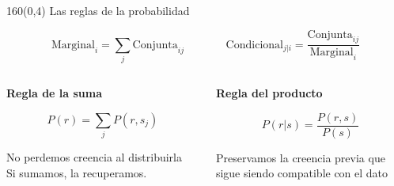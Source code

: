 \documentclass[shownotes,aspectratio=169]{beamer}
\begin{document}
\begin{frame}[plain]
\begin{textblock}{160}(0,4)
\centering \LARGE  Las reglas de la probabilidad
\end{textblock}

\vspace{0.75cm}



\begin{equation*}
  \text{Marginal}_{i} = \sum_j \text{Conjunta}_{ij}  \ \ \ \ \ \ \ \ \ \ \ \  \ \ \ \ \  \text{Condicional}_{j|i} = \frac{\text{Conjunta}_{ij}}{\text{Marginal}_{i}}
\end{equation*}

\vspace{0.75cm}


\begin{columns}[t]
\begin{column}{0.5\textwidth}
 \centering \textbf{Regla de la suma}


\begin{equation*}
 P(r) = \sum_j P(r,s_j)
\end{equation*}



 \footnotesize
 No perdemos creencia al distribuirla \\
 Si sumamos, la recuperamos.

 \end{column}
 \begin{column}{0.5\textwidth}
\centering  \textbf{Regla del producto}

\begin{equation*}
 P(r|s)  = \frac{P(r,s)}{P(s)}
\end{equation*}

\vspace{0.1cm}

\footnotesize
Preservamos la creencia previa que \\
sigue siendo compatible con el dato

\end{column}
\end{columns}

\end{frame}
\end{document}
